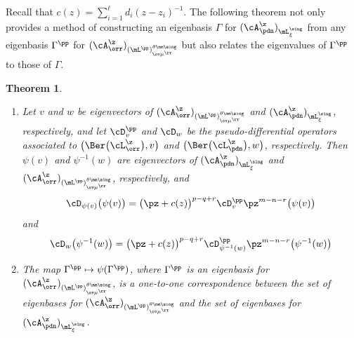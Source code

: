 \documentclass[11pt, reqno]{amsart}
\newtheorem{thm}{Theorem}[section]
\theoremstyle{definition}
\theoremstyle{remark}
\numberwithin{equation}{section}
\begin{document}
Recall that $c(z)=\sum_{i=1}^\ell d_i (z-z_i)^{-1}$.
The following theorem not only provides a method of constructing an eigenbasis $\Gamma$ for $(\cA_\pdn^\z)_{\mL^\sing_{\xi}}$ from any eigenbasis $\Gamma^\pp$ for $(\cA_\orr^\z)_{ (\mL^\pp)^{\theta\mm\sing}_{\ov\mu^\rr}}$ but also relates the eigenvalues of $\Gamma^\pp$ to those of $\Gamma$.

\begin{thm} \label{gls-gls-eigen}
\begin{enumerate}[\normalfont(i)]

\item Let $v$ and $w$ be eigenvectors of $(\cA_\orr^\z)_{ (\mL^\pp)^{\theta\mm\sing}_{\ov\mu^\rr}}$ and $(\cA_\pdn^\z)_{\mL^\sing_{\xi}}$, respectively, and let $\cD^\pp_v$ and $\cD_w$ be the pseudo-differential operators associated to $\big(\Ber \big(\cL_\orr^\z \big), v \big)$ and $\big(\Ber \big(\cL_\pdn^\z \big), w \big)$, respectively. 
Then $\psi (v)$ and $\psi^{-1}(w)$ are eigenvectors of $(\cA_\pdn^\z)_{\mL^\sing_{\xi}}$ and $(\cA_\orr^\z)_{ (\mL^\pp)^{\theta\mm\sing}_{\ov\mu^\rr}}$, respectively, and
\begin{equation} \label{eigen-1}
\cD_{\psi(v)} \big( \psi (v) \big) =  \big(\pz+c(z) \big)^{p-q+r}  \cD^\pp_v  \pz^{m-n-r}  \big(\psi (v) \big)
\end{equation}
and
\begin{equation} \label{eigen-2}
\cD_{w} \big( \psi^{-1}(w) \big) =  \big(\pz+c(z) \big)^{p-q+r}  \cD^\pp_{ \psi^{-1}(w)}  \pz^{m-n-r}  \big( \psi^{-1}(w) \big)
\end{equation}


\item The map $\Gamma^\pp  \mapsto \psi(\Gamma^\pp)$, where $\Gamma^\pp$ is an eigenbasis for $(\cA_\orr^\z)_{ (\mL^\pp)^{\theta\mm\sing}_{\ov\mu^\rr}}$, is a one-to-one correspondence between the set of eigenbases for $(\cA_\orr^\z)_{ (\mL^\pp)^{\theta\mm\sing}_{\ov\mu^\rr}}$ and the set of eigenbases for $(\cA_\pdn^\z)_{\mL^\sing_{\xi}}$.

\end{enumerate}
\end{thm}
\end{document}
